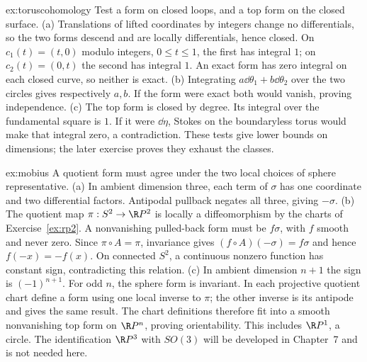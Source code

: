 \begin{solution}{ex:toruscohomology}
\idea Test a form on closed loops, and a top form on the closed surface.
\writeup (a) Translations of lifted coordinates by integers change no differentials, so the two forms descend and are locally differentials, hence closed. On $c_1(t)=(t,0)$ modulo integers, $0\le t\le1$, the first has integral $1$; on $c_2(t)=(0,t)$ the second has integral $1$. An exact form has zero integral on each closed curve, so neither is exact.
(b) Integrating $a\dd\theta_1+b\dd\theta_2$ over the two circles gives respectively $a,b$. If the form were exact both would vanish, proving independence.
(c) The top form is closed by degree. Its integral over the fundamental square is $1$. If it were $\dd\eta$, Stokes on the boundaryless torus would make that integral zero, a contradiction. These tests give lower bounds on dimensions; the later exercise proves they exhaust the classes.
\end{solution}

\begin{solution}{ex:mobius}
\idea A quotient form must agree under the two local choices of sphere representative.
\writeup (a) In ambient dimension three, each term of $\sigma$ has one coordinate and two differential factors. Antipodal pullback negates all three, giving $-\sigma$.
(b) The quotient map $\pi:S^2\to\R P^2$ is locally a diffeomorphism by the charts of Exercise~\ref{ex:rp2}. A nonvanishing pulled-back form must be $f\sigma$, with $f$ smooth and never zero. Since $\pi\circ A=\pi$, invariance gives $(f\circ A)(-\sigma)=f\sigma$ and hence $f(-x)=-f(x)$. On connected $S^2$, a continuous nonzero function has constant sign, contradicting this relation.
(c) In ambient dimension $n+1$ the sign is $(-1)^{n+1}$. For odd $n$, the sphere form is invariant. In each projective quotient chart define a form using one local inverse to $\pi$; the other inverse is its antipode and gives the same result. The chart definitions therefore fit into a smooth nonvanishing top form on $\R P^n$, proving orientability. This includes $\R P^1$, a circle. The identification $\R P^3$ with $SO(3)$ will be developed in Chapter~7 and is not needed here.
\end{solution}

